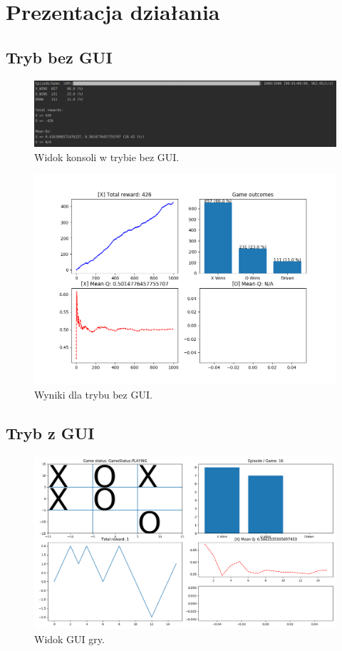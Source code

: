 \section{Prezentacja działania}

\subsection{Tryb bez GUI}

\begin{figure}[H]
	\centering
	\includegraphics[width=0.7\linewidth]{imgs/q_learning/overview/console}
	\caption{Widok konsoli w trybie bez GUI.}
\end{figure}

\begin{figure}[H]
	\centering
	\includegraphics[width=0.7\linewidth]{imgs/q_learning/overview/console_plots}
	\caption{Wyniki dla trybu bez GUI.}
\end{figure}

\subsection{Tryb z GUI}

\begin{figure}[H]
	\centering
	\includegraphics[width=0.7\linewidth]{imgs/q_learning/overview/gui_learn}
	\caption{Widok GUI gry.}
\end{figure}

